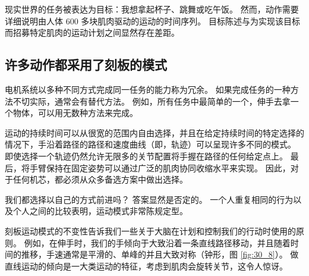 现实世界的任务被表达为目标：我想拿起杯子、跳舞或吃午饭。
然而，动作需要详细说明由人体 600 多块肌肉驱动的运动的时间序列。
目标陈述与为实现该目标而招募特定肌肉的运动计划之间显然存在差距。



\subsection{许多动作都采用了刻板的模式}

电机系统以多种不同方式完成同一任务的能力称为冗余。 
如果完成任务的一种方法不切实际，通常会有替代方法。 
例如，所有任务中最简单的一个，伸手去拿一个物体，可以用无数种方法来完成。


运动的持续时间可以从很宽的范围内自由选择，并且在给定持续时间的特定选择的情况下，手沿着路径的路径和速度曲线（即，轨迹）可以呈现许多不同的模式。
即使选择一个轨迹仍然允许无限多的关节配置将手握在路径的任何给定点上。
最后，将手臂保持在固定姿势可以通过广泛的肌肉协同收缩水平来实现。
因此，对于任何机芯，都必须从众多备选方案中做出选择。


我们都选择以自己的方式前进吗？
答案显然是否定的。
一个人重复相同的行为以及个人之间的比较表明，运动模式非常陈规定型。


刻板运动模式的不变性告诉我们一些关于大脑在计划和控制我们的行动时使用的原则。 
例如，在伸手时，我们的手倾向于大致沿着一条直线路径移动，并且随着时间的推移，手速通常是平滑的、单峰的并且大致对称（钟形，图 \ref{fig:30_8}）。 
做直线运动的倾向是一大类运动的特征，考虑到肌肉会旋转关节，这令人惊讶。

